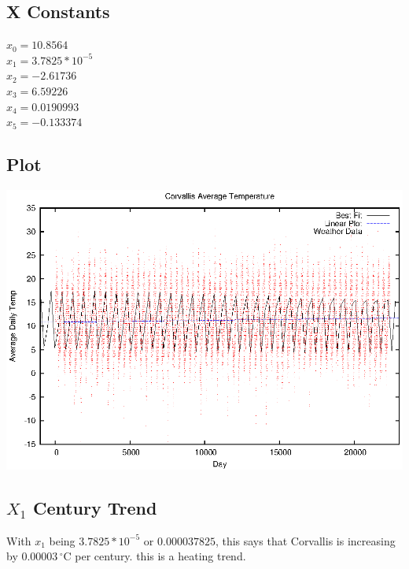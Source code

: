 \documentclass[letterpaper,10pt,titlepage]{article}
\begin{document}
\subsection*{X Constants}
$x_{0} = 10.8564$\\
$x_{1} = 3.7825 * 10^{-5}$\\
$x_{2} = -2.61736$\\
$x_{3} = 6.59226$\\
$x_{4} = 0.0190993$\\
$x_{5} = -0.133374$
\subsection*{Plot}
\includegraphics[width=\textwidth]{weather.eps}
\subsection*{$X_{1}$ Century Trend}
With $x_{1}$ being $3.7825 * 10^{-5}$ or $0.000037825$, this says that Corvallis is increasing by $0.00003\,^{\circ}\mathrm{C}$ per century. this is a heating trend.
\end{document}
